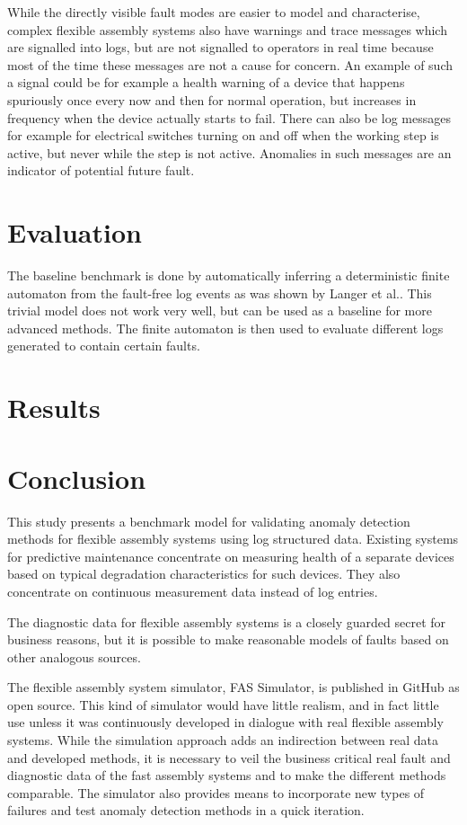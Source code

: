 \documentclass[journal]{IEEEtran}
\begin{document}
While the directly visible fault modes are easier to model and characterise, complex flexible assembly systems also have warnings and trace messages
which are signalled into logs, but are not signalled to operators in real time because most of the time these messages are not a cause for concern.
An example of such a signal could be for example a health warning of a device that happens spuriously once every now and then for normal operation,
but increases in frequency when the device actually starts to fail. There can also be log messages for example for electrical switches turning
on and off when the working step is active, but never while the step is not active. Anomalies in such messages are an indicator of potential
future fault.

\section{Evaluation}

The baseline benchmark is done by automatically inferring a deterministic finite automaton from the fault-free log events as was shown by Langer et al.\cite{langer2011self}.
This trivial model does not work very well, but can be used as a baseline for more advanced methods. The finite automaton is then used to evaluate different logs generated to
contain certain faults.

\section{Results}

\section{Conclusion}

This study presents a benchmark model for validating anomaly detection methods for flexible assembly systems using log structured data.
Existing systems for predictive maintenance concentrate on measuring health of a separate devices based on typical degradation characteristics
for such devices. They also concentrate on continuous measurement data instead of log entries.

The diagnostic data for flexible assembly systems is a closely guarded secret for business reasons, but it is possible to make reasonable models
of faults based on other analogous sources.

The flexible assembly system simulator, FAS Simulator, is published in GitHub\cite{FASSimulator} as open source. This kind of simulator would have
little realism, and in fact little use unless it was continuously developed in dialogue with real flexible assembly systems. While the simulation
approach adds an indirection between real data and developed methods, it is necessary to veil the business critical real fault and diagnostic
data of the fast assembly systems and to make the different methods comparable. The simulator also provides means to incorporate new types of
failures and test anomaly detection methods in a quick iteration.
\end{document}
